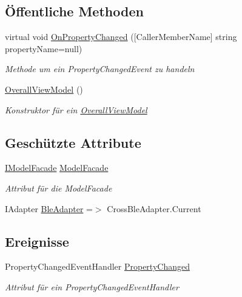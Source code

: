 \subsection*{Öffentliche Methoden}
\begin{DoxyCompactItemize}
\item 
virtual void \mbox{\hyperlink{classmy_m_d_1_1_view_model_1_1_overall_view_model_1_1_overall_view_model_a0333c153387ba2d38fb31eeb0419bfcf}{On\+Property\+Changed}} (\mbox{[}Caller\+Member\+Name\mbox{]} string property\+Name=null)
\begin{DoxyCompactList}\small\item\em Methode um ein Property\+Changed\+Event zu handeln \end{DoxyCompactList}\item 
\mbox{\hyperlink{classmy_m_d_1_1_view_model_1_1_overall_view_model_1_1_overall_view_model_a1cc6b22c187773cdc72ee92f21ea5aba}{Overall\+View\+Model}} ()
\begin{DoxyCompactList}\small\item\em Konstruktor für ein \mbox{\hyperlink{classmy_m_d_1_1_view_model_1_1_overall_view_model_1_1_overall_view_model}{Overall\+View\+Model}} \end{DoxyCompactList}\end{DoxyCompactItemize}
\subsection*{Geschützte Attribute}
\begin{DoxyCompactItemize}
\item 
\mbox{\hyperlink{interfacemy_m_d_1_1_model_interface_1_1_model_facade_interface_1_1_i_model_facade}{I\+Model\+Facade}} \mbox{\hyperlink{classmy_m_d_1_1_view_model_1_1_overall_view_model_1_1_overall_view_model_ab1b0e7b2ed9ae07614caa1e45b942e3f}{Model\+Facade}}
\begin{DoxyCompactList}\small\item\em Attribut für die Model\+Facade \end{DoxyCompactList}\item 
I\+Adapter \mbox{\hyperlink{classmy_m_d_1_1_view_model_1_1_overall_view_model_1_1_overall_view_model_acff4179c3cbf2cd35046729e99cd6921}{Ble\+Adapter}} =$>$ Cross\+Ble\+Adapter.\+Current
\end{DoxyCompactItemize}
\subsection*{Ereignisse}
\begin{DoxyCompactItemize}
\item 
Property\+Changed\+Event\+Handler \mbox{\hyperlink{classmy_m_d_1_1_view_model_1_1_overall_view_model_1_1_overall_view_model_a1918d3d8d384486e278426327b16256f}{Property\+Changed}}
\begin{DoxyCompactList}\small\item\em Attribut für ein Property\+Changed\+Event\+Handler \end{DoxyCompactList}\end{DoxyCompactItemize}


